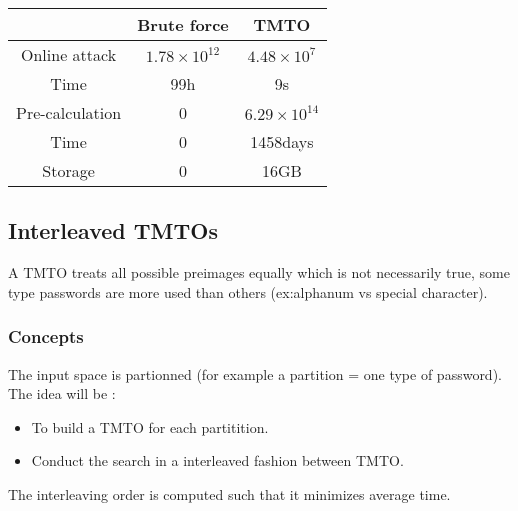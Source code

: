 \begin{center}
\begin{tabular}{|c|c|c|}
    \hline
    & Brute force & TMTO \\
    \hline
    Online attack & $1.78 \times 10^{12}$ &  $4.48 \times 10^7$\\
    Time & 99h & 9s\\
    \hline
    Pre-calculation & 0 & $6.29 \times 10^{14}$\\
    Time & 0 & 1458days \\
    Storage & 0 & 16GB \\
    \hline
\end{tabular}
\end{center}

\subsection{Interleaved TMTOs}
A TMTO treats all possible preimages equally which is not necessarily true,
some type passwords are more used than others (ex:alphanum vs special character).
\subsubsection{Concepts}
The input space is partionned (for example a partition = one type of password).
The idea will be :
\begin{itemize}
	\item To build a TMTO for each partitition.
	\item Conduct the search in a interleaved fashion between TMTO.
\end{itemize}
The interleaving order is computed such that it minimizes average time.


